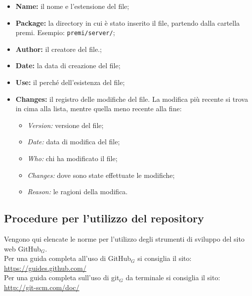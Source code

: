 \begin{itemize}
\item \textbf{Name:} il nome e l'estensione del file;
\item \textbf{Package:} la directory in cui è stato inserito il file, partendo dalla cartella premi. Esempio: \texttt{premi/server/};
\item \textbf{Author:} il creatore del file.;
\item \textbf{Date:} la data di creazione del file;
\item \textbf{Use:} il perché dell'esistenza del file;
\item \textbf{Changes:} il registro delle modifiche del file. La modifica più recente si trova in cima alla lista, mentre quella meno recente alla fine:
	\begin{itemize}
		\item \textit{Version:} versione del file;
		\item \textit{Date:} data di modifica del file;
		\item \textit{Who:} chi ha modificato il file;
		\item \textit{Changes:} dove sono state effettuate le modifiche;
		\item \textit{Reason:} le ragioni della modifica.
	\end{itemize}
\end{itemize}

\subsection{Procedure per l'utilizzo del repository} \label{procedureticket}
Vengono qui elencate le norme per l'utilizzo degli strumenti di sviluppo del sito web GitHub$_G$. \\
Per una guida completa all'uso di GitHub$_G$ si consiglia il sito: \\
\url{https://guides.github.com/}\\
Per una guida completa sull'uso di git$_G$ da terminale si consiglia il sito: \\
\url{http://git-scm.com/doc/}

